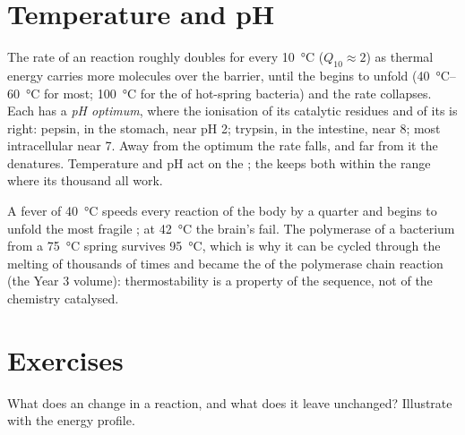 \section{Temperature and pH}

\begin{proposition}\label{prop:b1:enzymes:environment}
The rate of an  reaction roughly doubles for every
\qty{10}{\celsius} ($Q_{10} \approx 2$) as thermal energy carries more
molecules over the barrier, until the  begins to unfold
(\qtyrange{40}{60}{\celsius} for most; \qty{100}{\celsius} for the
 of hot-spring bacteria) and the rate collapses. Each  has
a \emph{pH optimum}, where the ionisation of its catalytic residues
and of its  is right: pepsin, in the stomach, near pH 2;
trypsin, in the intestine, near 8; most intracellular  near 7.
Away from the optimum the rate falls, and far from it the 
denatures. Temperature and pH act on the ; the  keeps both
within the range where its thousand  all work.
\end{proposition}

\begin{example}\label{ex:b1:enzymes:fever}
A fever of \qty{40}{\celsius} speeds every reaction of the body by a
quarter and begins to unfold the most fragile ; at
\qty{42}{\celsius} the brain's fail. The  polymerase of a bacterium
from a \qty{75}{\celsius} spring survives \qty{95}{\celsius}, which is
why it can be cycled through the melting of  thousands of times
and became the  of the polymerase chain reaction (the Year 3
volume): thermostability is a property of the sequence, not of the
chemistry catalysed.
\end{example}

\section{Exercises}

\begin{exercise}[$\star$]\label{exo:b1:enzymes:1}
What does an  change in a reaction, and what does it leave
unchanged? Illustrate with the energy profile.
\end{exercise}

